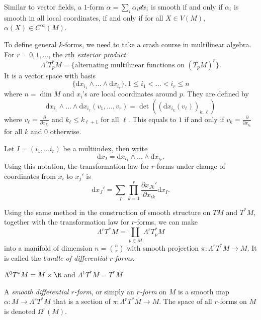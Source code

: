 \documentclass[a4paper]{article}
\newcommand{\w}{\wedge}
\begin{document}
Similar to vector fields, a \(1\)-form \(\alpha = \sum_i \alpha_i \mathcal dx_i\) is smooth if and only if \(\alpha_i\) is smooth in all local coordinates, if and only if for all \(X \in V(M)\), \(\alpha(X) \in C^\infty(M)\).

To define general \(k\)-forms, we need to take a crash course in multilinear algebra. For \(r = 0, 1, \dots\), the \(r\)th \emph{exterior product}
\[
  \Lambda^r T_p^*M = \{\text{alternating multilinear functions on } (T_pM)^r\}.
\]
It is a vector space with basis
\[
  \{\mathrm dx_{i_1} \w \dots \w \mathrm dx_{i_r}\}, 1 \leq i_1 < \dots < i_r \leq n
\]
where \(n = \dim M\) and \(x_i\)'s are local coordinates around \(p\). They are defined by
\[
  \mathrm dx_{i_1} \w \dots \w \mathrm dx_{i_r} (v_1, \dots, v_r) = \det( (\mathrm dx_{i_k}(v_\ell))_{k, \ell})
\]
where \(v_\ell = \frac{\partial  }{\partial x_{k_\ell}}\) and \(k_\ell \leq k_{\ell + 1}\) for all \(\ell\). This equals to \(1\) if and only if \(v_k = \frac{\partial  }{\partial x_{i_k}}\) for all \(k\) and \(0\) otherwise.

\begin{notation}
  Let \(I = (i_1, \dots i_r)\) be a multiindex, then write
  \[
    \mathrm dx_I = \mathrm dx_{i_1} \w \dots \w \mathrm dx_{i_r}.
  \]
  Using this notation, the transformation law for \(r\)-forms under change of coordinates from \(x_i\) to \(x_j'\) is
  \[
    \mathrm dx_J' = \sum_I \prod_{k = 1}^r \frac{\partial x_{Jk}'}{\partial x_{ik}} \mathrm dx_I.
  \]
\end{notation}

Using the same method in the construction of smooth structure on \(TM\) and \(T^*M\), together with the transformation law for \(r\)-forms, we can make
\[
  \Lambda^rT^*M = \coprod_{p \in M} \Lambda^r T_p^*M
\]
into a manifold of dimension \(n = \binom{n}{r}\) with smooth projection \(\pi: \Lambda^rT^*M \to M\). It is called the \emph{bundle of differential \(r\)-forms}.

\begin{note}
  \(\Lambda^0T^*M = M \times \R\) and \(\Lambda^1T^*M = T^*M\)
\end{note}

\begin{definition}
  A \emph{smooth differential \(r\)-form}, or simply an \emph{\(r\)-form} on \(M\) is a smooth map \(\alpha: M \to \Lambda^rT^*M\) that is a section of \(\pi: \Lambda^rT^*M \to M\). The space of all \(r\)-forms on \(M\) is denoted \(\Omega^r(M)\).
\end{definition}
\end{document}
